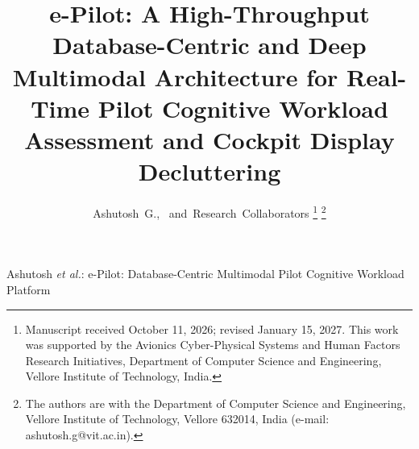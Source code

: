 \documentclass[journal]{IEEEtran}
\begin{document}
\title{e-Pilot: A High-Throughput Database-Centric and Deep Multimodal Architecture for Real-Time Pilot Cognitive Workload Assessment and Cockpit Display Decluttering}

\author{Ashutosh~G.,~
        and~Research~Collaborators%
\thanks{Manuscript received October 11, 2026; revised January 15, 2027. This work was supported by the Avionics Cyber-Physical Systems and Human Factors Research Initiatives, Department of Computer Science and Engineering, Vellore Institute of Technology, India.}%
\thanks{The authors are with the Department of Computer Science and Engineering, Vellore Institute of Technology, Vellore 632014, India (e-mail: ashutosh.g@vit.ac.in).}%
}

%
{Ashutosh \MakeLowercase{\textit{et al.}}: e-Pilot: Database-Centric Multimodal Pilot Cognitive Workload Platform}

\maketitle
\end{document}
